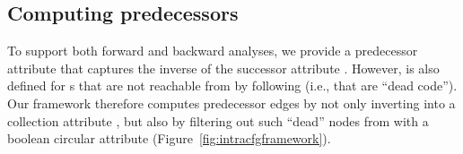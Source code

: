 \subsection{Computing predecessors}

To support both forward and backward analyses, we provide a predecessor attribute that captures the inverse of the successor attribute .
However,  is also defined for s that are not reachable from  by following  (i.e., that are ``dead code'').
Our framework therefore computes predecessor edges  by not only inverting  into a collection attribute , but also by filtering out such ``dead'' nodes from  with a boolean circular attribute  (Figure~\ref{fig:intracfgframework}).

%
%
%
%
%
%
%
%
%
%
%
%






